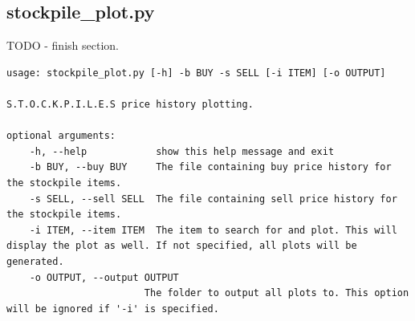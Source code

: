 \subsection{stockpile\_plot.py}

TODO - finish section.

\begin{lstlisting}
usage: stockpile_plot.py [-h] -b BUY -s SELL [-i ITEM] [-o OUTPUT]

S.T.O.C.K.P.I.L.E.S price history plotting.

optional arguments:
	-h, --help            show this help message and exit
	-b BUY, --buy BUY     The file containing buy price history for the stockpile items.
	-s SELL, --sell SELL  The file containing sell price history for the stockpile items.
	-i ITEM, --item ITEM  The item to search for and plot. This will display the plot as well. If not specified, all plots will be generated.
	-o OUTPUT, --output OUTPUT
	                    The folder to output all plots to. This option will be ignored if '-i' is specified.
\end{lstlisting}










